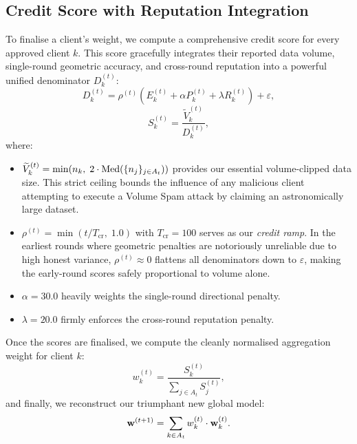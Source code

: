 \documentclass[../main.tex]{subfiles}
\begin{document}
\subsection{Credit Score with Reputation Integration}
\label{sec:aegis_credit}

To finalise a client's weight, we compute a comprehensive credit score for every approved client $k$. This score gracefully integrates their reported data volume, single-round geometric accuracy, and cross-round reputation into a powerful unified denominator $D_k^{(t)}$:
\begin{equation}
    D_k^{(t)} = \rho^{(t)}\!\left(E_k^{(t)} + \alpha P_k^{(t)} + \lambda R_k^{(t)}\right) + \varepsilon,
    \label{eq:denominator}
\end{equation}
\begin{equation}
    S_k^{(t)} = \frac{\widetilde{V}_k^{(t)}}{D_k^{(t)}},
    \label{eq:credit_score}
\end{equation}
where:
\begin{itemize}
    \item $\widetilde{V}_k^{(t)} = \min\!\left(n_k,\; 2 \cdot \operatorname{Med}\!\left(\{n_j\}_{j \in A_t}\right)\right)$ provides our essential volume-clipped data size. This strict ceiling bounds the influence of any malicious client attempting to execute a Volume Spam attack by claiming an astronomically large dataset.
    \item $\rho^{(t)} = \min(t / T_{\text{cr}},\; 1.0)$ with $T_{\text{cr}} = 100$ serves as our \emph{credit ramp}. In the earliest rounds where geometric penalties are notoriously unreliable due to high honest variance, $\rho^{(t)} \approx 0$ flattens all denominators down to $\varepsilon$, making the early-round scores safely proportional to volume alone.
    \item $\alpha = 30.0$ heavily weights the single-round directional penalty.
    \item $\lambda = 20.0$ firmly enforces the cross-round reputation penalty.
\end{itemize}

Once the scores are finalised, we compute the cleanly normalised aggregation weight for client $k$:
\begin{equation}
    w_k^{(t)} = \frac{S_k^{(t)}}{\displaystyle\sum_{j \in A_t} S_j^{(t)}},
    \label{eq:normalized_score}
\end{equation}
and finally, we reconstruct our triumphant new global model:
\begin{equation}
    \mathbf{w}^{(t+1)} = \sum_{k \in A_t} w_k^{(t)} \cdot \mathbf{w}_k^{(t)}.
    \label{eq:final_aggregation}
\end{equation}
\end{document}
